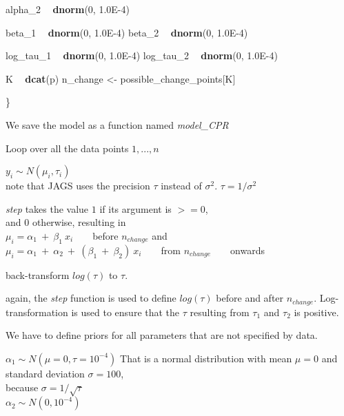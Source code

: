 \documentclass[]{article}
\newenvironment{Shaded}{\begin{snugshade}}{\end{snugshade}}
\newcommand{\KeywordTok}[1]{\textcolor[rgb]{0.13,0.29,0.53}{\textbf{#1}}}
\newcommand{\DecValTok}[1]{\textcolor[rgb]{0.00,0.00,0.81}{#1}}
\newcommand{\FloatTok}[1]{\textcolor[rgb]{0.00,0.00,0.81}{#1}}
\newcommand{\StringTok}[1]{\textcolor[rgb]{0.31,0.60,0.02}{#1}}
\newcommand{\OperatorTok}[1]{\textcolor[rgb]{0.81,0.36,0.00}{\textbf{#1}}}
\newcommand{\NormalTok}[1]{#1}
\begin{document}
\begin{Shaded}
\begin{Highlighting}[]
  
\NormalTok{  alpha_}\DecValTok{2} \OperatorTok{~}\StringTok{ }\KeywordTok{dnorm}\NormalTok{(}\DecValTok{0}\NormalTok{, }\FloatTok{1.0E-4}\NormalTok{)}
  
\NormalTok{  beta_}\DecValTok{1} \OperatorTok{~}\StringTok{ }\KeywordTok{dnorm}\NormalTok{(}\DecValTok{0}\NormalTok{, }\FloatTok{1.0E-4}\NormalTok{)}
\NormalTok{  beta_}\DecValTok{2} \OperatorTok{~}\StringTok{ }\KeywordTok{dnorm}\NormalTok{(}\DecValTok{0}\NormalTok{, }\FloatTok{1.0E-4}\NormalTok{)}
  
\NormalTok{  log_tau_}\DecValTok{1} \OperatorTok{~}\StringTok{ }\KeywordTok{dnorm}\NormalTok{(}\DecValTok{0}\NormalTok{, }\FloatTok{1.0E-4}\NormalTok{)}
\NormalTok{  log_tau_}\DecValTok{2} \OperatorTok{~}\StringTok{ }\KeywordTok{dnorm}\NormalTok{(}\DecValTok{0}\NormalTok{, }\FloatTok{1.0E-4}\NormalTok{)}
  
\NormalTok{  K }\OperatorTok{~}\StringTok{ }\KeywordTok{dcat}\NormalTok{(p)}
\NormalTok{  n_change <-}\StringTok{ }\NormalTok{possible_change_points[K]}

\NormalTok{\}}
\end{Highlighting}
\end{Shaded}

We save the model as a function named \emph{model\_CPR}

Loop over all the data points \(1,...,n\)

\(y_i \sim N(\mu_i, \tau_i)\)\\
note that JAGS uses the precision \(\tau\) instead of \(\sigma^2\).
\(\tau = 1/\sigma^2\)

\emph{step} takes the value \(1\) if its argument is \(>= 0\),\\
and \(0\) otherwise, resulting in\\
\(\mu_i = \alpha_1~+~\beta_1~x_i\) ~ ~ before \(n_{change}\) and\\
\(\mu_i = \alpha_1~+~\alpha_2~+~(\beta_1~+~\beta_2)~x_i\) ~ ~ from
\(n_{change}\) ~ ~ onwards

back-transform \(log(\tau)\) to \(\tau\).

again, the \emph{step} function is used to define \(log(\tau)\) before
and after \(n_{change}\). Log-transformation is used to ensure that the
\(\tau\) resulting from \(\tau_1\) and \(\tau_2\) is positive.

We have to define priors for all parameters that are not specified by
data.

\(\alpha_1 \sim N(\mu = 0, \tau = 10^{-4})\) That is a normal
distribution with mean \(\mu = 0\) and standard deviation
\(\sigma = 100\),\\
because \(\sigma = 1/\sqrt{\tau}\)\\
\(\alpha_2 \sim N(0, 10^{-4})\)
\end{document}
